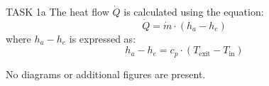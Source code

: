 TASK 1a  
The heat flow \( \dot{Q} \) is calculated using the equation:  
\[
\dot{Q} = \dot{m} \cdot (h_a - h_e)
\]  
where \( h_a - h_e \) is expressed as:  
\[
h_a - h_e = c_p \cdot (T_{\text{exit}} - T_{\text{in}})
\]  

No diagrams or additional figures are present.